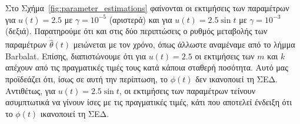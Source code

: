 \documentclass[a4paper,12pt]{article}
\begin{document}
Στο Σχήμα~\ref{fig:parameter_estimations} φαίνονται οι εκτιμήσεις των παραμέτρων για $u(t) = 2.5$ με 
$\gamma = 10^{-5}$ (αριστερά) και για $u(t) = 2.5 \sin t$ με $\gamma = 10^{-3}$ (δεξιά). Παρατηρούμε ότι και
στις δύο περιπτώσεις ο ρυθμός μεταβολής των παραμέτρων $\dot{\hat{\theta}}(t)$ μειώνεται με τον χρόνο, όπως 
άλλωστε αναμέναμε από το λήμμα Barbalat. Επίσης, διαπιστώνουμε 
ότι για $u(t) = 2.5$ οι εκτιμήσεις των $m$ και $k$ απέχουν από τις πραγματικές τιμές τους κατά κάποια σταθερή 
ποσότητα. Αυτό μας προϊδεάζει ότι, ίσως σε αυτή την περίπτωση, το $\phi(t)$ δεν ικανοποιεί τη ΣΕΔ. Αντιθέτως,
για $u(t) = 2.5 \sin t$, οι εκτιμήσεις των παραμέτρων τείνουν ασυμπτωτικά να γίνουν ίσες με τις πραγματικές 
τιμές, κάτι που αποτελεί ένδειξη ότι το $\phi(t)$ ικανοποιεί τη ΣΕΔ.
\end{document}
